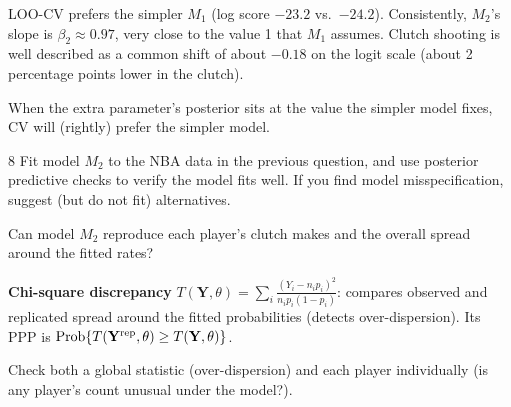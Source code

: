 \documentclass[11pt]{article}
\begin{document}
\begin{answer}
LOO-CV prefers the simpler $M_1$ (log score $-23.2$ vs.\ $-24.2$). Consistently, $M_2$'s slope is $\beta_2\approx0.97$, very close to the value 1 that $M_1$ assumes. Clutch shooting is well described as a common shift of about $-0.18$ on the logit scale (about 2 percentage points lower in the clutch).
\end{answer}

\begin{takeaway}
When the extra parameter's posterior sits at the value the simpler model fixes, CV will (rightly) prefer the simpler model.
\end{takeaway}


\begin{problem}{8}
Fit model $M_2$ to the NBA data in the previous question, and use posterior predictive checks to verify the model fits well. If you find model misspecification, suggest (but do not fit) alternatives.
\end{problem}

\begin{restate}
Can model $M_2$ reproduce each player's clutch makes and the overall spread around the fitted rates?
\end{restate}

\begin{recall}
\textbf{Chi-square discrepancy} $T(\mathbf Y,\theta)=\sum_i\frac{(Y_i-n_ip_i)^2}{n_ip_i(1-p_i)}$: compares observed and replicated spread around the fitted probabilities (detects over-dispersion). Its PPP is $\mathrm{Prob}\{T(\mathbf Y^{\text{rep}},\theta)\ge T(\mathbf Y,\theta)\}$.
\end{recall}

\begin{keyidea}
Check both a global statistic (over-dispersion) and each player individually (is any player's count unusual under the model?).
\end{keyidea}
\end{document}
